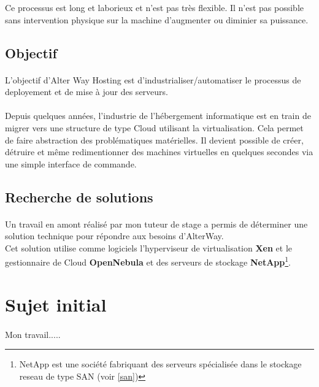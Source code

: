 Ce processus est long et laborieux et n'est pas très flexible. Il n'est pas possible sans intervention physique sur la machine d'augmenter ou diminier sa puissance.

\subsection{Objectif}
\paragraph*{}
L'objectif d'Alter Way Hosting est d'industrialiser/automatiser le processus de deployement et de mise à jour des serveurs.

\paragraph*{}
Depuis quelques années, l'industrie de l'hébergement informatique est en train de migrer vers une structure de type Cloud utilisant la virtualisation.
Cela permet de faire abstraction des problématiques matérielles. Il devient possible de créer, détruire et même redimentionner des machines virtuelles en
quelques secondes via une simple interface de commande.



\subsection{Recherche de solutions}
\paragraph*{}
Un travail en amont réalisé par mon tuteur de stage a permis de déterminer une solution technique pour répondre aux besoins d'AlterWay.\\
Cet solution utilise comme logiciels l'hyperviseur de virtualisation \textbf{Xen} et le gestionnaire de Cloud \textbf{OpenNebula} et des
serveurs de stockage \textbf{NetApp}\footnote{NetApp est une société fabriquant des serveurs spécialisée dans le stockage reseau de type SAN (voir \ref{san})}.

\section{Sujet initial}
\paragraph*{}
Mon travail.....


